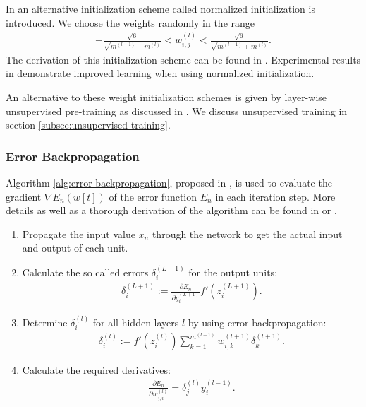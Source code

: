 In \cite{GlorotBengio:2010} an alternative initialization scheme called normalized initialization is introduced. We choose the weights randomly in the range
\begin{align}
	\label{eq:normalized-initialization}
	- \frac{\sqrt{6}}{\sqrt{m^{(l-1)} + m^{(l)}}} < w_{i,j}^{(l)} < \frac{\sqrt{6}}{\sqrt{m^{(l-1)} + m^{(l)}}}.
\end{align}
The derivation of this initialization scheme can be found in \cite{GlorotBengio:2010}. Experimental results in \cite{GlorotBengio:2010} demonstrate improved learning when using normalized initialization.

An alternative to these weight initialization schemes is given by layer-wise unsupervised pre-training as discussed in \cite{ErhanBengioCourvilleManzagolVincentBengio:2010}. We discuss unsupervised training in section \ref{subsec:unsupervised-training}.

\subsubsection{Error Backpropagation}
\label{subsubsec:error-backproagation}

Algorithm \ref{alg:error-backpropagation}, proposed in \cite{RumelhartHintonWilliams:1986}, is used to evaluate the gradient $\nabla E_n (w[t])$ of the error function $E_n$ in each iteration step. More details as well as a thorough derivation of the algorithm can be found in \cite{Bishop:1995} or \cite{RumelhartHintonWilliams:1986}. 

\begin{algorithm}
	\label{alg:error-backpropagation}
	\begin{enumerate}[1.]
		\item Propagate the input value $x_n$ through the network to get the actual input and output of each unit.
		\item Calculate the so called errors $\delta_i^{(L+1)}$ \cite[p.~241-245]{Bishop:2006} for the output units:
		\begin{align}
			\delta_i^{(L+1)} := \frac{\partial E_n}{\partial y_i^{(L+1)}} f'(z_i^{(L+1)}).
		\end{align}
		\item Determine $\delta _i ^{(l)}$ for all hidden layers $l$ by using error backpropagation:
		\begin{align}
			\delta _i ^{(l)} := f' (z_i^{(l)}) \sum _{k = 1} ^{m^{(l+1)}} w_{i,k}^{(l+1)} \delta _k ^{(l+1)}.
		\end{align}
		\item Calculate the required derivatives:
		\begin{align}
			\label{eq:backprop-derivative}
			\frac{\partial E_n}{\partial w_{j,i}^{(l)}} = \delta _j ^{(l)} y_i^{(l-1)}.
		\end{align}
	\end{enumerate}
\end{algorithm}

